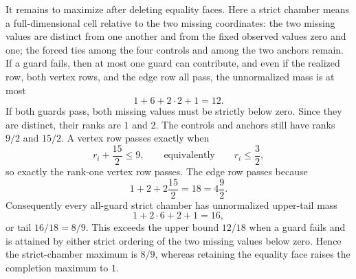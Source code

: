 It remains to maximize after deleting equality faces.  Here a strict chamber means a full-dimensional cell relative to the two missing coordinates: the two missing values are distinct from one another and from the fixed observed values zero and one; the forced ties among the four controls and among the two anchors remain.  If a guard fails, then at most one guard can contribute, and even if the realized row, both vertex rows, and the edge row all pass, the unnormalized mass is at most
\[
 1+6+2\cdot2+1=12.
\]
If both guards pass, both missing values must be strictly below zero.  Since they are distinct, their ranks are \(1\) and \(2\).  The controls and anchors still have ranks \(9/2\) and \(15/2\).  A vertex row passes exactly when
\[
 r_i+\frac{15}{2}\le 9,
 \qquad\text{equivalently}\qquad
 r_i\le\frac32,
\]
so exactly the rank-one vertex row passes.  The edge row passes because
\[
 1+2+2\frac{15}{2}=18=4\frac92.
\]
Consequently every all-guard strict chamber has unnormalized upper-tail mass
\[
 1+2\cdot6+2+1=16,
\]
or tail \(16/18=8/9\).  This exceeds the upper bound \(12/18\) when a guard fails and is attained by either strict ordering of the two missing values below zero.  Hence the strict-chamber maximum is \(8/9\), whereas retaining the equality face raises the completion maximum to \(1\).
